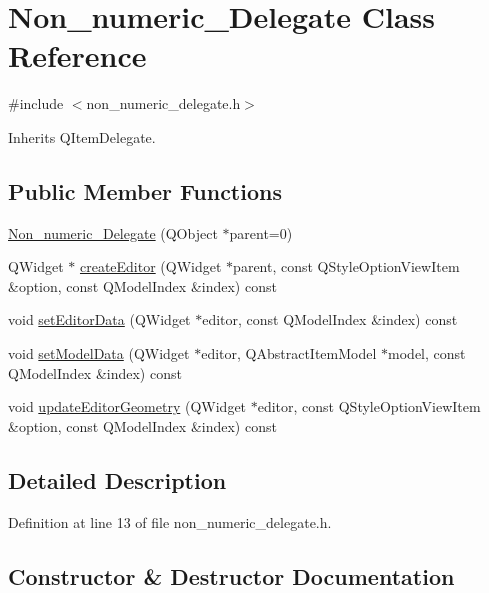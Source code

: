 \hypertarget{classNon__numeric__Delegate}{}\section{Non\+\_\+numeric\+\_\+\+Delegate Class Reference}
\label{classNon__numeric__Delegate}


{\ttfamily \#include $<$non\+\_\+numeric\+\_\+delegate.\+h$>$}



Inherits Q\+Item\+Delegate.

\subsection*{Public Member Functions}
\begin{DoxyCompactItemize}
\item 
\hyperlink{classNon__numeric__Delegate_ae2fb0931922c20c796bfa85921dc880f}{Non\+\_\+numeric\+\_\+\+Delegate} (Q\+Object $\ast$parent=0)
\item 
Q\+Widget $\ast$ \hyperlink{classNon__numeric__Delegate_a073f05382a36c178750c522fe82dda8d}{create\+Editor} (Q\+Widget $\ast$parent, const Q\+Style\+Option\+View\+Item \&option, const Q\+Model\+Index \&index) const
\item 
void \hyperlink{classNon__numeric__Delegate_a8d3048dc7212637a785670aa5f5c9043}{set\+Editor\+Data} (Q\+Widget $\ast$editor, const Q\+Model\+Index \&index) const
\item 
void \hyperlink{classNon__numeric__Delegate_a517cb55e57c8a6c86eee133141f7b6cb}{set\+Model\+Data} (Q\+Widget $\ast$editor, Q\+Abstract\+Item\+Model $\ast$model, const Q\+Model\+Index \&index) const
\item 
void \hyperlink{classNon__numeric__Delegate_ac5d634e38c5445a0c9220008840488b9}{update\+Editor\+Geometry} (Q\+Widget $\ast$editor, const Q\+Style\+Option\+View\+Item \&option, const Q\+Model\+Index \&index) const
\end{DoxyCompactItemize}


\subsection{Detailed Description}


Definition at line 13 of file non\+\_\+numeric\+\_\+delegate.\+h.



\subsection{Constructor \& Destructor Documentation}
\mbox{\label{classNon__numeric__Delegate_ae2fb0931922c20c796bfa85921dc880f}} 
